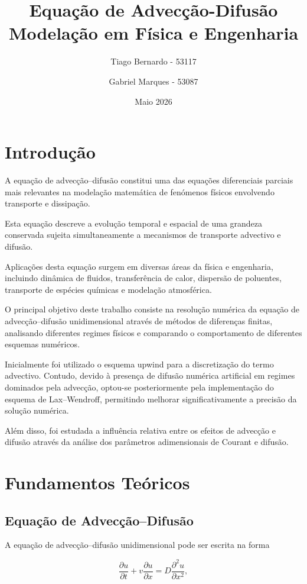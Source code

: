 \documentclass{article}
\title{\textbf{Equação de Advecção-Difusão}\\
Modelação em Física e Engenharia}
\author{Tiago Bernardo - 53117 \and Gabriel Marques - 53087}
\date{Maio 2026}
\begin{document}
\maketitle

\section{Introdução}

A equação de advecção--difusão constitui uma das equações diferenciais parciais mais relevantes na modelação matemática de fenómenos físicos envolvendo transporte e dissipação.

Esta equação descreve a evolução temporal e espacial de uma grandeza conservada sujeita simultaneamente a mecanismos de transporte advectivo e difusão.

Aplicações desta equação surgem em diversas áreas da física e engenharia, incluindo dinâmica de fluidos, transferência de calor, dispersão de poluentes, transporte de espécies químicas e modelação atmosférica.

O principal objetivo deste trabalho consiste na resolução numérica da equação de advecção--difusão unidimensional através de métodos de diferenças finitas, analisando diferentes regimes físicos e comparando o comportamento de diferentes esquemas numéricos.

Inicialmente foi utilizado o esquema upwind para a discretização do termo advectivo. Contudo, devido à presença de difusão numérica artificial em regimes dominados pela advecção, optou-se posteriormente pela implementação do esquema de Lax--Wendroff, permitindo melhorar significativamente a precisão da solução numérica.

Além disso, foi estudada a influência relativa entre os efeitos de advecção e difusão através da análise dos parâmetros adimensionais de Courant e difusão.

\section{Fundamentos Teóricos}

\subsection{Equação de Advecção--Difusão}

A equação de advecção--difusão unidimensional pode ser escrita na forma

\[
\frac{\partial u}{\partial t}
+
v\frac{\partial u}{\partial x}
=
D\frac{\partial^2 u}{\partial x^2},
\]
\end{document}
